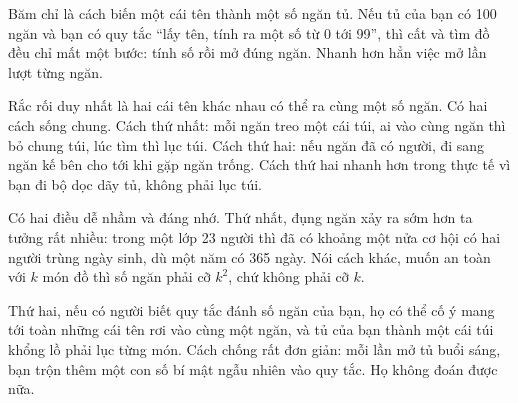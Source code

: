 \documentclass[../../algorithm.tex]{subfiles}
\begin{document}
\begin{dongian}
Băm chỉ là cách biến một cái tên thành một số ngăn tủ. Nếu tủ của bạn có 100 ngăn và bạn có quy tắc ``lấy tên, tính ra một số từ 0 tới 99'', thì cất và tìm đồ đều chỉ mất một bước: tính số rồi mở đúng ngăn. Nhanh hơn hẳn việc mở lần lượt từng ngăn.

Rắc rối duy nhất là hai cái tên khác nhau có thể ra cùng một số ngăn. Có hai cách sống chung. Cách thứ nhất: mỗi ngăn treo một cái túi, ai vào cùng ngăn thì bỏ chung túi, lúc tìm thì lục túi. Cách thứ hai: nếu ngăn đã có người, đi sang ngăn kế bên cho tới khi gặp ngăn trống. Cách thứ hai nhanh hơn trong thực tế vì bạn đi bộ dọc dãy tủ, không phải lục túi.

Có hai điều dễ nhầm và đáng nhớ. Thứ nhất, đụng ngăn xảy ra sớm hơn ta tưởng rất nhiều: trong một lớp 23 người thì đã có khoảng một nửa cơ hội có hai người trùng ngày sinh, dù một năm có 365 ngày. Nói cách khác, muốn an toàn với \(k\) món đồ thì số ngăn phải cỡ \(k^2\), chứ không phải cỡ \(k\).

Thứ hai, nếu có người biết quy tắc đánh số ngăn của bạn, họ có thể cố ý mang tới toàn những cái tên rơi vào cùng một ngăn, và tủ của bạn thành một cái túi khổng lồ phải lục từng món. Cách chống rất đơn giản: mỗi lần mở tủ buổi sáng, bạn trộn thêm một con số bí mật ngẫu nhiên vào quy tắc. Họ không đoán được nữa.
\end{dongian}
\end{document}
